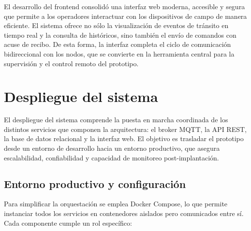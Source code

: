El desarrollo del frontend consolidó una interfaz web moderna, accesible y segura que permite a los operadores interactuar con los dispositivos de campo de manera eficiente.  
El sistema ofrece no sólo la visualización de eventos de tránsito en tiempo real y la consulta de históricos, sino también el envío de comandos con acuse de recibo.  
De esta forma, la interfaz completa el ciclo de comunicación bidireccional con los nodos, que se convierte en la herramienta central para la supervisión y el control remoto del prototipo.



\section{Despliegue del sistema}

El despliegue del sistema comprende la puesta en marcha coordinada de los distintos servicios que componen la arquitectura: el broker MQTT, la API REST, la base de datos relacional y la interfaz web.  
El objetivo es trasladar el prototipo desde un entorno de desarrollo hacia un entorno productivo, que asegura escalabilidad, confiabilidad y capacidad de monitoreo post-implantación.  

\subsection{Entorno productivo y configuración}

Para simplificar la orquestación se emplea Docker Compose, lo que permite instanciar todos los servicios en contenedores aislados pero comunicados entre sí.  
Cada componente cumple un rol específico:  

